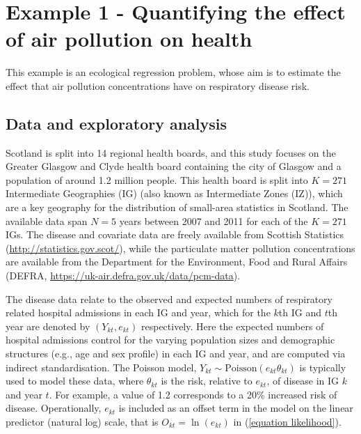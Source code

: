\documentclass[article, nojss]{jss}
\begin{document}
\section{Example 1 - Quantifying the effect of air pollution on health}\label{section5}
This example is an ecological regression problem, whose aim is to estimate the effect that air pollution concentrations have on respiratory disease risk. 


\subsection{Data and exploratory analysis}
Scotland is split into 14 regional health boards, and this study focuses on the Greater Glasgow and Clyde health board containing  the city of Glasgow and a population of around 1.2 million people. This health board is split into $K=271$ Intermediate Geographies (IG) (also known as Intermediate Zones (IZ)), which are a key geography for the distribution of small-area statistics in Scotland. The available data span $N=5$ years  between 2007 and 2011 for each of the $K=271$ IGs. The disease and covariate data are freely available from Scottish Statistics (\url{http://statistics.gov.scot/}), while the particulate matter pollution concentrations are available from the Department for the Environment, Food and Rural Affairs (DEFRA, \url{https://uk-air.defra.gov.uk/data/pcm-data}).

\hspace{1cm} The disease data relate to the observed and expected numbers of respiratory related hospital admissions in each IG and year, which for the $k$th IG and $t$th year are denoted by $(Y_{kt}, e_{kt})$ respectively. Here the expected numbers of hospital admissions control for the varying population sizes and demographic structures (e.g., age and sex profile) in each IG and year, and are computed via indirect standardisation.  The Poisson  model, $Y_{kt}\sim\mbox{Poisson}(e_{kt}\theta_{kt})$ is typically used to model these data, where $\theta_{kt}$ is the risk, relative to $e_{kt}$, of disease in IG $k$ and year $t$. For example, a value of 1.2 corresponds to a 20\% increased risk of disease. Operationally, $e_{kt}$ is included as an offset term in the model on the linear predictor (natural log) scale, that is $O_{kt}=\ln(e_{kt})$ in (\ref{equation likelihood}). 
\end{document}
